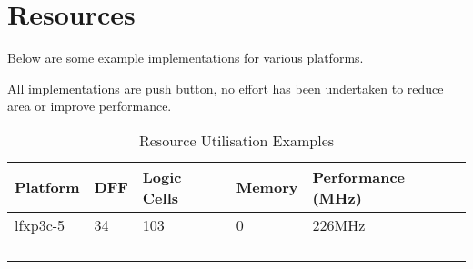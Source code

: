 \chapter{Resources}\label{resources}

Below are some example implementations for various platforms.

All implementations are push button, no effort has been undertaken to
reduce area or improve performance.

\begin{longtable}[]{@{}lllll@{}}
\toprule
Platform & DFF & Logic Cells & Memory & Performance (MHz)\tabularnewline
\midrule
\endhead
lfxp3c-5 & 34 & 103 & 0 & 226MHz\tabularnewline
& & & &\tabularnewline
& & & &\tabularnewline
& & & &\tabularnewline
\bottomrule
\caption{Resource Utilisation Examples}
\end{longtable}